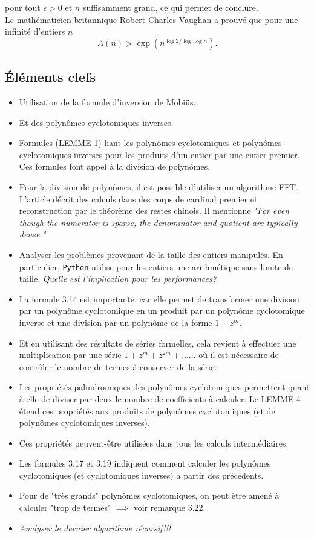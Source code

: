 \documentclass{article}
\theoremstyle{break}                  %
\begin{document}
pour tout $\epsilon > 0$ et $n$ suffisamment grand, ce qui permet de conclure.\\

Le mathématicien britannique Robert Charles Vaughan a prouvé que pour une infinité d'entiers $n$
$$A(n) > \exp\left(n^{\log 2/ \log \log n}\right).$$




\subsection*{Éléments clefs}
\begin{itemize}
	\item Utilisation de la formule d'inversion de Mobiüs.
	\item Et des polynômes cyclotomiques inverses.
	\item Formules (LEMME 1) liant les polynômes cyclotomiques et polynômes cyclotomiques inverses pour les produits d'un entier par une entier premier. Ces formules font appel à la division de polynômes.
	\item Pour la division de polynômes, il est possible d'utiliser un algorithme FFT. L'article décrit des calculs dans des corps de cardinal premier et reconstruction par le théorème des restes chinois. Il mentionne \textit{"For even though the numerator is sparse, the denominator and quotient are typically dense."}
	\item Analyser les problèmes provenant de la taille des entiers manipulés. En particulier, \texttt{Python} utilise pour les entiers une arithmétique sans limite de taille. \textit{Quelle est l'implication pour les performances?}
	\item La formule 3.14 est importante, car elle permet de transformer une division par un polynôme cyclotomique en un produit par un polynôme cyclotomique inverse et une division par un polynôme de la forme $1 - z^m$.
	\item Et en utilisant des résultats de séries formelles, cela revient à effectuer une multiplication par une série $1 + z^m + z^{2m} + \dots$... où il est nécessaire de contrôler le nombre de termes à conserver de la série.
	\item Les propriétés palindromiques des polynômes cyclotomiques permettent quant à elle de diviser par deux le nombre de coefficients à calculer. Le LEMME 4 étend ces propriétés aux produits de polynômes cyclotomiques (et de polynômes cyclotomiques inverses).
	\item Ces propriétés peuvent-être utilisées dans tous les calculs intermédiaires.
	\item Les formules 3.17 et 3.19 indiquent comment calculer les polynômes cyclotomiques (et cyclotomiques inverses) à partir des précédents.
	\item Pour de "très grands" polynômes cyclotomiques, on peut être amené à calculer "trop de termes" $\implies$ voir remarque 3.22.
	\item \textit{Analyser le dernier algorithme récursif!!!}
\end{itemize}
\end{document}
